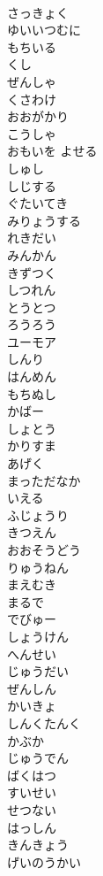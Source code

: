 \documentclass[8pt]{extreport}
\begin{document}
\begin{CJK}{UTF8}{min}
\\	さっきょく
\\	ゆいいつむに
\\	もちいる
\\	くし
\\	ぜんしゃ
\\	くさわけ
\\	おおがかり
\\	こうしゃ
\\	おもいを よせる
\\	しゅし
\\	しじする
\\	ぐたいてき
\\	みりょうする
\\	れきだい
\\	みんかん
\\	きずつく
\\	しつれん
\\	とうとつ
\\	ろうろう
\\	ユーモア
\\	しんり
\\	はんめん
\\	もちぬし
\\	かばー
\\	しょとう
\\	かりすま
\\	あげく
\\	まっただなか
\\	いえる
\\	ふじょうり
\\	きつえん
\\	おおそうどう
\\	りゅうねん
\\	まえむき
\\	まるで
\\	でびゅー
\\	しょうけん
\\	へんせい
\\	じゅうだい
\\	ぜんしん
\\	かいきょ
\\	しんくたんく
\\	かぶか
\\	じゅうでん
\\	ばくはつ
\\	すいせい
\\	せつない
\\	はっしん
\\	きんきょう
\\	げいのうかい

\end{CJK}
\end{document}

